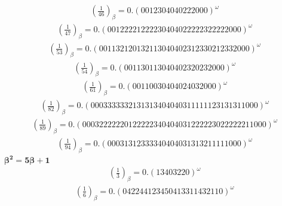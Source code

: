 \documentclass[fleqn]{article}
\begin{document}
\begin{equation*}
\begin{split}
(\frac{1}{46})_\beta = 0.(0012304040222000)^\omega
\end{split}\end{equation*}
\begin{equation*}
\begin{split}
(\frac{1}{47})_\beta = 0.(00122221222230404022222322222000)^\omega
\end{split}\end{equation*}
\begin{equation*}
\begin{split}
(\frac{1}{53})_\beta = 0.(001132120132113040402312330212332000)^\omega
\end{split}\end{equation*}
\begin{equation*}
\begin{split}
(\frac{1}{54})_\beta = 0.(001130113040402320232000)^\omega
\end{split}\end{equation*}
\begin{equation*}
\begin{split}
(\frac{1}{61})_\beta = 0.(00110030404024032000)^\omega
\end{split}\end{equation*}
\begin{equation*}
\begin{split}
(\frac{1}{82})_\beta = 0.(0003333332131313404040311111123131311000)^\omega
\end{split}\end{equation*}
\begin{equation*}
\begin{split}
(\frac{1}{89})_\beta = 0.(00032222220122222340404031222223022222211000)^\omega
\end{split}\end{equation*}
\begin{equation*}
\begin{split}
(\frac{1}{94})_\beta = 0.(00031312333340404031313211111000)^\omega
\end{split}\end{equation*}
$\boldsymbol{\beta^2 = 5\beta + 1}$
\begin{equation*}
\begin{split}
(\frac{1}{3})_\beta = 0.(13403220)^\omega
\end{split}\end{equation*}
\begin{equation*}
\begin{split}
(\frac{1}{6})_\beta = 0.(042244123450413311432110)^\omega
\end{split}\end{equation*}
\end{document}
